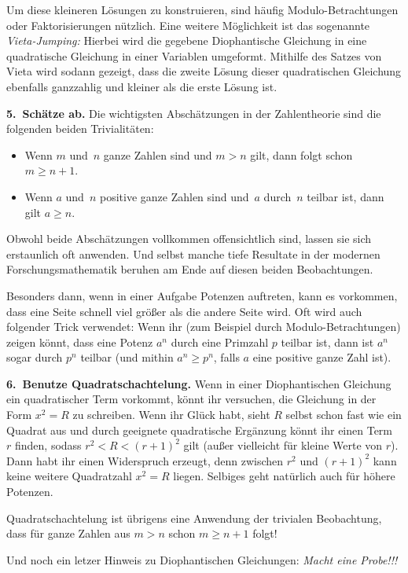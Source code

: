 Um diese kleineren Lösungen zu konstruieren, sind häufig Modulo-Betrachtungen oder Faktorisierungen nützlich. Eine weitere Möglichkeit ist das sogenannte \emph{Vieta-Jumping:} Hierbei wird die gegebene Diophantische Gleichung in eine quadratische Gleichung in einer Variablen umgeformt. Mithilfe des Satzes von Vieta wird sodann gezeigt, dass die zweite Lösung dieser quadratischen Gleichung ebenfalls ganzzahlig und kleiner als die erste Lösung ist.

\textbf{5.~Schätze ab.} Die wichtigsten Abschätzungen in der Zahlentheorie sind die folgenden beiden Trivialitäten:
\begin{itemize}
	\item Wenn $m$ und~$n$ ganze Zahlen sind und $m>n$ gilt, dann folgt schon $m\geqslant n+1$.
	\item Wenn $a$ und~$n$ positive ganze Zahlen sind und~$a$ durch~$n$ teilbar ist, dann gilt $a\geqslant n$.
\end{itemize}
Obwohl beide Abschätzungen vollkommen offensichtlich sind, lassen sie sich erstaunlich oft anwenden. Und selbst manche tiefe Resultate in der modernen Forschungsmathematik beruhen am Ende auf diesen beiden Beobachtungen.

Besonders dann, wenn in einer Aufgabe Potenzen auftreten, kann es vorkommen, dass eine Seite schnell viel größer als die andere Seite wird. Oft wird auch folgender Trick verwendet: Wenn ihr (zum Beispiel durch Modulo-Betrachtungen) zeigen könnt, dass eine Potenz $a^n$ durch eine Primzahl $p$ teilbar ist, dann ist $a^n$ sogar durch $p^n$ teilbar (und mithin $a^n\geqslant p^n$, falls $a$ eine positive ganze Zahl ist).

\textbf{6.~Benutze Quadratschachtelung.} Wenn in einer Diophantischen Gleichung ein quadratischer Term vorkommt, könnt ihr versuchen, die Gleichung in der Form $x^2=R$ zu schreiben. Wenn ihr Glück habt, sieht $R$ selbst schon fast wie ein Quadrat aus und durch geeignete quadratische Ergänzung könnt ihr einen Term~$r$ finden, sodass $r^2<R<(r+1)^2$ gilt (außer vielleicht für kleine Werte von $r$). Dann habt ihr einen Widerspruch erzeugt, denn zwischen $r^2$ und $(r+1)^2$ kann keine weitere Quadratzahl $x^2=R$ liegen. Selbiges geht natürlich auch für höhere Potenzen.

Quadratschachtelung ist übrigens eine Anwendung der trivialen Beobachtung, dass für ganze Zahlen aus $m>n$ schon $m\geqslant n+1$ folgt!

Und noch ein letzer Hinweis zu Diophantischen Gleichungen: \emph{Macht eine Probe!!!}

